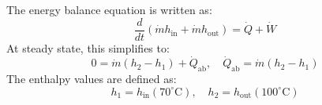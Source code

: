 The energy balance equation is written as:  
\[
\frac{d}{dt} \left( \dot{m} h_{\text{in}} + \dot{m} h_{\text{out}} \right) = \dot{Q} + \dot{W}
\]  
At steady state, this simplifies to:  
\[
0 = \dot{m} (h_2 - h_1) + \dot{Q}_{\text{ab}}, \quad \dot{Q}_{\text{ab}} = \dot{m} (h_2 - h_1)
\]  
The enthalpy values are defined as:  
\[
h_1 = h_{\text{in}} (70^\circ\text{C}), \quad h_2 = h_{\text{out}} (100^\circ\text{C})
\]